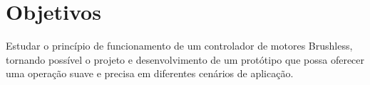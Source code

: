 \chapter{Objetivos}
Estudar o princípio de funcionamento de um controlador de motores Brushless, tornando possível o projeto e desenvolvimento de um protótipo que possa oferecer uma operação suave e precisa em diferentes cenários de aplicação.

